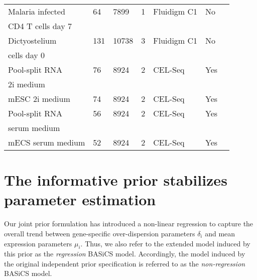 \begin{table}[hb	]
\begin{tabular}{lllllll}
Malaria infected  & 64       & 7899     & 1          & Fluidigm C1       & No   & \citep{Lonnberg2017}         \\
CD4\plus{}  T cells day 7    &   & &  &  &  &   \\
\midrule

Dictyostelium             & 131      & 10738    & 3          & Fluidigm C1       & No   & \citep{Antolovic2017}        \\
cells day 0  &  &   &   &  & & \\
\midrule

Pool-split RNA                 & 76       & 8924     & 2          & CEL-Seq           & Yes  & \citep{Grun2014}            \\
2i medium  &  &  & &  &  & \\
\midrule

mESC 2i medium    & 74       & 8924     & 2          & CEL-Seq           & Yes  & \citep{Grun2014} \\
\midrule

Pool-split RNA             & 56       & 8924     & 2          & CEL-Seq           & Yes  & \citep{Grun2014}            \\
serum medium &  &      &         &   &   &  \\
\midrule

mECS serum medium & 52       & 8924     & 2          & CEL-Seq           & Yes  & \citep{Grun2014} \\
\bottomrule       
\end{tabular}
\end{table}


\section{The informative prior stabilizes parameter estimation}
\label{sec2:stabilization}

Our joint prior formulation has introduced a non-linear regression to capture the overall trend between gene-specific over-dispersion parameters $\delta_i$ and mean expression parameters $\mu_i$. Thus, we also refer to the extended model induced by this prior as the \textit{regression} BASiCS model. Accordingly, the model induced by the original independent prior specification \citep{Vallejos2016} is referred to as the \textit{non-regression} BASiCS model.\\ 

